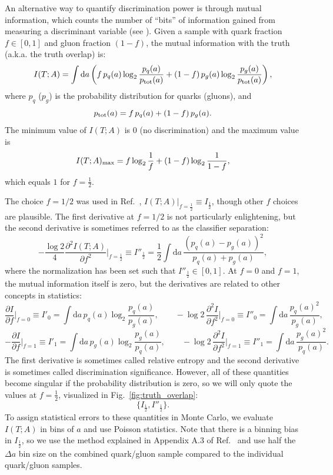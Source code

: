 \documentclass[11pt,letterpaper]{article}
\newcommand{\df}{\text{d}}
\DeclareRobustCommand{\Fig}[1]{Fig.~\ref{#1}}
\DeclareRobustCommand{\Ref}[1]{Ref.~\cite{#1}}
\newcommand{\be}{\begin{equation}}
\newcommand{\ee}{\end{equation}}
\begin{document}
An alternative way to quantify discrimination power is through mutual information, which counts the number of ``bits'' of information gained from measuring a discriminant variable (see \cite{Larkoski:2014pca}).  Given a sample with quark fraction $f \in [0,1]$ and gluon fraction $(1-f)$, the mutual information with the truth (a.k.a. the truth overlap) is:
\be
I(T;A) = \int \df a \left(f \, p_q(a) \log_2 \frac{p_q(a)}{p_{\rm tot}(a)} + (1-f) \, p_g(a) \log_2 \frac{p_g(a)}{p_{\rm tot}(a)}   \right),
\ee
where $p_q$ ($p_g$) is the probability distribution for quarks (gluons), and
\be
p_{\rm tot}(a) = f \, p_q(a) + (1-f) \, p_g(a).
\ee
The minimum value of $I(T;A)$ is $0$ (no discrimination) and the maximum value is
\be
I(T;A)_{\rm max} = f \log_2 \frac{1}{f} + (1-f) \log_2 \frac{1}{1-f},
\ee
which equals $1$ for $f = \frac{1}{2}$.

The choice $f = 1/2$ was used in \Ref{Larkoski:2014pca}, $I(T;A)\big|_{f = \frac{1}{2}} \equiv I_{\frac{1}{2}}$, though other $f$ choices are plausible.  The first derivative at $f = 1/2$ is not particularly enlightening, but the second derivative is sometimes referred to as the classifier separation:
\be
- \frac{\log 2}{4} \frac{\partial^2 I(T;A)}{\partial f^2} \Big|_{f = \frac{1}{2}} \equiv I''_\frac{1}{2} = \frac{1}{2} \int \df a \, \frac{\left(p_q(a) - p_g(a)\right)^2}{p_q(a) + p_g(a)},
\ee
where the normalization has been set such that $I''_\frac{1}{2} \in [0,1]$.  At $f = 0$ and $f = 1$, the mutual information itself is zero, but the derivatives are related to other concepts in statistics:
\be
\frac{\partial I}{\partial f} \Big|_{f = 0} \equiv I'_0 = \int \df a \, p_q(a)  \log_2 \frac{p_q(a)}{p_g(a)}, \qquad - \log 2 \,  \frac{\partial^2 I}{\partial f^2} \Big|_{f = 0} \equiv I''_0 = \int \df a \,  \frac{p_q(a)^2}{p_g(a)},
\ee
\be
- \frac{\partial I}{\partial f} \Big|_{f = 1} \equiv I'_1 = \int \df a \, p_g(a) \log_2 \frac{p_g(a)}{p_q(a)}, \qquad - \log 2 \, \frac{\partial^2 I}{\partial f^2} \Big|_{f = 1} \equiv I''_1 = \int \df a \, \frac{p_g(a)^2}{p_q(a)}.
\ee
The first derivative is sometimes called relative entropy and the second derivative is sometimes called discrimination significance.  However, all of these quantities become singular if the probability distribution is zero, so we will only quote the values at $f = \frac{1}{2}$, visualized in \Fig{fig:truth_overlap}:
\be
\{I_\frac{1}{2}, I''_{\frac{1}{2}} \}.
\ee
To assign statistical errors to these quantities in Monte Carlo, we evaluate $I(T;A)$ in bins of $a$ and use Poisson statistics.  Note that there is a binning bias in $I_\frac{1}{2}$, so we use the method explained in Appendix A.3 of \Ref{Larkoski:2014pca} and use half the $\Delta a$ bin size on the combined quark/gluon sample compared to the individual quark/gluon samples.
\end{document}
